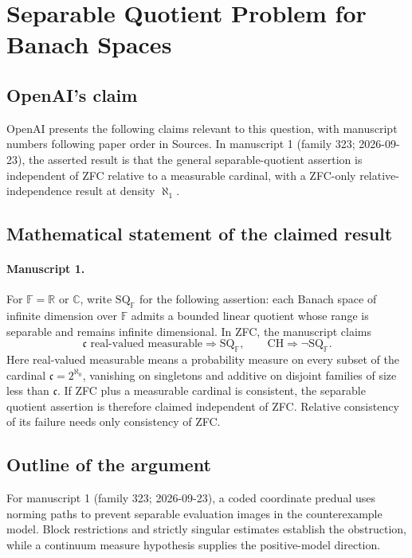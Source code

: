 \documentclass[11pt]{article}
\begin{document}
\section*{Separable Quotient Problem for Banach Spaces}

\subsection{OpenAI's claim}
OpenAI presents the following claims relevant to this question, with manuscript numbers following paper order in Sources. In manuscript 1 (family 323; 2026-09-23), the asserted result is that the general separable-quotient assertion is independent of ZFC relative to a measurable cardinal, with a ZFC-only relative-independence result at density $\aleph_1$.

\subsection{Mathematical statement of the claimed result}
\paragraph{Manuscript 1.}
For $\mathbb F=\mathbb R$ or $\mathbb C$, write $\mathrm{SQ}_{\mathbb F}$ for the following assertion: each Banach space of infinite dimension over $\mathbb F$ admits a bounded linear quotient whose range is separable and remains infinite dimensional. In ZFC, the manuscript claims
\[
 \mathfrak c\text{ real-valued measurable}\Rightarrow\mathrm{SQ}_{\mathbb F},
 \qquad\mathrm{CH}\Rightarrow\neg\mathrm{SQ}_{\mathbb F}.
\]
Here real-valued measurable means a probability measure on every subset of the cardinal $\mathfrak c=2^{\aleph_0}$, vanishing on singletons and additive on disjoint families of size less than $\mathfrak c$. If ZFC plus a measurable cardinal is consistent, the separable quotient assertion is therefore claimed independent of ZFC. Relative consistency of its failure needs only consistency of ZFC.

\subsection{Outline of the argument}
For manuscript 1 (family 323; 2026-09-23), a coded coordinate predual uses norming paths to prevent separable evaluation images in the counterexample model. Block restrictions and strictly singular estimates establish the obstruction, while a continuum measure hypothesis supplies the positive-model direction.
\end{document}
